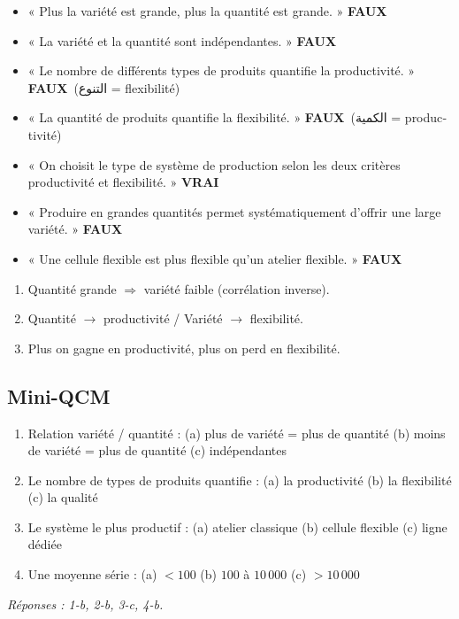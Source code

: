 \documentclass[11pt,a4paper]{article}
\newcommand{\ar}[1]{\textarabic{#1}}
\newcommand{\fr}[1]{\textfrench{#1}}
\newcommand{\vrai}{\textcolor{vert}{\textbf{VRAI}}}
\newcommand{\faux}{\textcolor{rouge}{\textbf{FAUX}}}
\begin{document}
\begin{piege}
\begin{itemize}
\item « Plus la variété est grande, plus la quantité est grande. » \faux
\item « La variété et la quantité sont indépendantes. » \faux
\item « Le nombre de différents types de produits quantifie la productivité. » \faux \ \ar{(التنوع = \fr{flexibilité})}
\item « La quantité de produits quantifie la flexibilité. » \faux \ \ar{(الكمية = \fr{productivité})}
\item « On choisit le type de système de production selon les deux critères productivité et flexibilité. » \vrai
\item « Produire en grandes quantités permet systématiquement d'offrir une large variété. » \faux
\item « Une cellule flexible est plus flexible qu'un atelier flexible. » \faux
\end{itemize}
\end{piege}

\begin{resume}
\begin{enumerate}
\item Quantité grande $\Rightarrow$ variété faible (corrélation inverse).
\item Quantité $\rightarrow$ productivité \quad / \quad Variété $\rightarrow$ flexibilité.
\item Plus on gagne en productivité, plus on perd en flexibilité.
\end{enumerate}
\end{resume}

\subsection*{Mini-QCM}
\begin{enumerate}
\item Relation variété / quantité : (a) plus de variété = plus de quantité (b) moins de variété = plus de quantité (c) indépendantes
\item Le nombre de types de produits quantifie : (a) la productivité (b) la flexibilité (c) la qualité
\item Le système le plus productif : (a) atelier classique (b) cellule flexible (c) ligne dédiée
\item Une moyenne série : (a) $<100$ (b) $100$ à $10\,000$ (c) $>10\,000$
\end{enumerate}
{\small\textit{Réponses : 1-b, 2-b, 3-c, 4-b.}}
\end{document}
